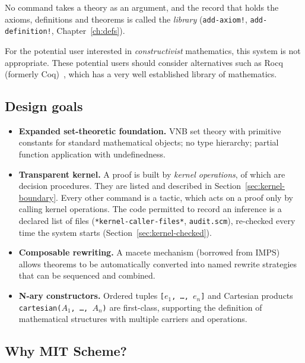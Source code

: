 No command takes a theory as an argument, and the record that holds the axioms,
definitions and theorems is called the \emph{library}
(\texttt{add-axiom!}, \texttt{add-definition!}, Chapter~\ref{ch:defs}).

\begin{remark}\label{remark:27137-61828-986360}
%
For the potential user interested in \emph{constructivist} mathematics,
this system is not appropriate. These potential users should consider
alternatives such as Rocq (formerly Coq)~\cite{Rocq}, which has a very well established library of
mathematics.
%
\end{remark}

\subsection{Design goals}

\begin{itemize}
\item \textbf{Expanded set-theoretic foundation.}  VNB set theory with
  primitive constants for standard mathematical objects; no type
  hierarchy; partial function application with undefinedness.
\item \textbf{Transparent kernel.}  A proof is built by
  \VNBkernelopcount{} \emph{kernel operations}, of which
  \VNBkernelopcountoracle{} are decision procedures.  They are listed and
  described in Section~\ref{sec:kernel-boundary}.  Every other command is a
  tactic, which acts on a proof only by calling kernel operations.  The
  code permitted to record an inference is a declared list of files (\texttt{*kernel-caller-files*}, \texttt{audit.scm}),
  re-checked every time the system starts
  (Section~\ref{sec:kernel-checked}).
\item \textbf{Composable rewriting.}  A macete mechanism (borrowed from
  IMPS) allows theorems to be automatically converted into named rewrite
  strategies that can be sequenced and combined.
\item \textbf{N-ary constructors.}  Ordered tuples \texttt{[$e_1$,
  \ldots, $e_n$]} and Cartesian products \texttt{cartesian($A_1$, \ldots,
  $A_n$)} are first-class, supporting the definition of mathematical
  structures with multiple carriers and operations.
\end{itemize}

\subsection{Why MIT Scheme?}

